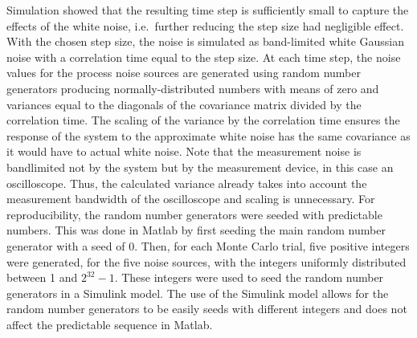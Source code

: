 \documentclass[../zhang_thesis.tex]{subfiles}
\begin{document}
Simulation showed that the resulting time step is sufficiently small to capture the effects of the white noise, i.e.\ further reducing the step size had negligible effect. With the chosen step size, the noise is simulated as band-limited white Gaussian noise with a correlation time equal to the step size. At each time step, the noise values for the process noise sources are generated using random number generators producing normally-distributed numbers with means of zero and variances equal
to the diagonals of the covariance matrix divided by the correlation time. The scaling of the variance by the correlation time ensures the response of the system to the approximate white noise has the same covariance as it would have to actual white noise. Note that the measurement noise is bandlimited not by the system but by the measurement device, in this case an oscilloscope. Thus, the calculated variance already takes into account the measurement bandwidth of the oscilloscope and
scaling is unnecessary. For reproducibility, the random number generators were seeded with predictable numbers. This was done in Matlab by first seeding the main random number generator with a seed of 0. Then, for each Monte Carlo trial, five positive integers were generated, for the five noise sources, with the integers uniformly distributed between 1 and $2^{32}-1$. These integers were used to seed the random number generators in a Simulink model. The use of the Simulink model allows for the
random number generators to be easily seeds with different integers and does not affect the predictable sequence in Matlab.
\end{document}
